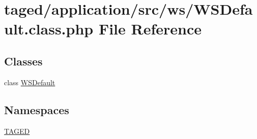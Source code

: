 \hypertarget{_w_s_default_8class_8php}{}\section{taged/application/src/ws/\+W\+S\+Default.class.\+php File Reference}
\label{_w_s_default_8class_8php}
\subsection*{Classes}
\begin{DoxyCompactItemize}
\item 
class \hyperlink{class_w_s_default}{W\+S\+Default}
\end{DoxyCompactItemize}
\subsection*{Namespaces}
\begin{DoxyCompactItemize}
\item 
 \hyperlink{namespace_t_a_g_e_d}{T\+A\+G\+ED}
\end{DoxyCompactItemize}
